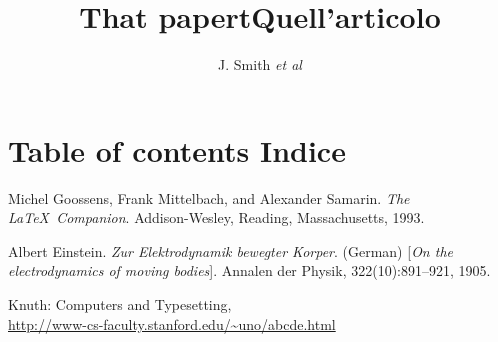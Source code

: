 \documentclass[a4paper]{article}
\begin{document}
\author{J. Smith
\emph{et al}
}
\title{\ifCDLeng That papert\fi\ifCDLita Quell'articolo\fi}
\maketitle








\section*{\ifCDLeng Table of contents \fi  \ifCDLita Indice\fi}
\tableofcontents

\printindex




\begin{thebibliography}{9}
Michel Goossens, Frank Mittelbach, and Alexander Samarin. 
\textit{The \LaTeX\ Companion}. 
Addison-Wesley, Reading, Massachusetts, 1993.

Albert Einstein. 
\textit{Zur Elektrodynamik bewegter Korper}. (German) 
[\textit{On the electrodynamics of moving bodies}]. 
Annalen der Physik, 322(10):891–921, 1905.

Knuth: Computers and Typesetting,
\\ \url{http://www-cs-faculty.stanford.edu/~uno/abcde.html}
\end{thebibliography}
\end{document}
